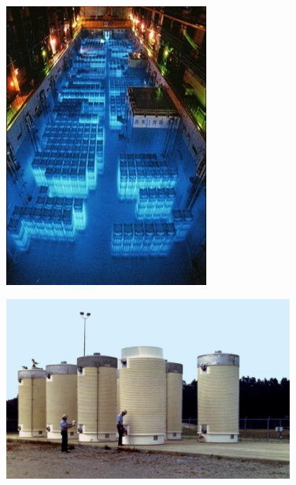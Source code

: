 \documentclass[aspectratio=1610,pdftex,dvipsnames,compress,xcolor={dvipsnames}]{beamer}
\begin{document}
\begin{frame}{}
    \begin{figure}
        \centering
        \includegraphics[width=0.60\textwidth]{pool.jpg}
    \end{figure}
\end{frame}


\begin{frame}{}
    \begin{figure}
        \centering
        \includegraphics[width=0.85\textwidth]{dry.casks.jpg}
    \end{figure}
\end{frame}
\end{document}
